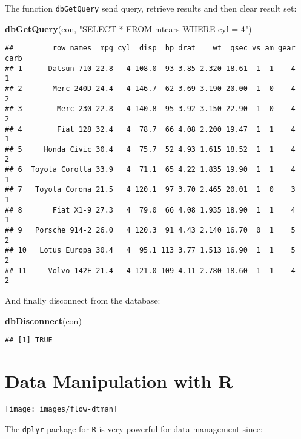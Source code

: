 \documentclass[]{book}
\newenvironment{Shaded}{\begin{snugshade}}{\end{snugshade}}
\newcommand{\KeywordTok}[1]{\textcolor[rgb]{0.13,0.29,0.53}{\textbf{{#1}}}}
\newcommand{\StringTok}[1]{\textcolor[rgb]{0.31,0.60,0.02}{{#1}}}
\newcommand{\NormalTok}[1]{{#1}}
\begin{document}
The function \texttt{dbGetQuery} send query, retrieve results and then
clear result set:

\begin{Shaded}
\begin{Highlighting}[]
\KeywordTok{dbGetQuery}\NormalTok{(con, }\StringTok{"SELECT * FROM mtcars WHERE cyl = 4"}\NormalTok{)}
\end{Highlighting}
\end{Shaded}

\begin{verbatim}
##         row_names  mpg cyl  disp  hp drat    wt  qsec vs am gear carb
## 1      Datsun 710 22.8   4 108.0  93 3.85 2.320 18.61  1  1    4    1
## 2       Merc 240D 24.4   4 146.7  62 3.69 3.190 20.00  1  0    4    2
## 3        Merc 230 22.8   4 140.8  95 3.92 3.150 22.90  1  0    4    2
## 4        Fiat 128 32.4   4  78.7  66 4.08 2.200 19.47  1  1    4    1
## 5     Honda Civic 30.4   4  75.7  52 4.93 1.615 18.52  1  1    4    2
## 6  Toyota Corolla 33.9   4  71.1  65 4.22 1.835 19.90  1  1    4    1
## 7   Toyota Corona 21.5   4 120.1  97 3.70 2.465 20.01  1  0    3    1
## 8       Fiat X1-9 27.3   4  79.0  66 4.08 1.935 18.90  1  1    4    1
## 9   Porsche 914-2 26.0   4 120.3  91 4.43 2.140 16.70  0  1    5    2
## 10   Lotus Europa 30.4   4  95.1 113 3.77 1.513 16.90  1  1    5    2
## 11     Volvo 142E 21.4   4 121.0 109 4.11 2.780 18.60  1  1    4    2
\end{verbatim}

And finally disconnect from the database:

\begin{Shaded}
\begin{Highlighting}[]
\KeywordTok{dbDisconnect}\NormalTok{(con)}
\end{Highlighting}
\end{Shaded}

\begin{verbatim}
## [1] TRUE
\end{verbatim}

\chapter{Data Manipulation with R}\label{data-manipulation-with-r}

\begin{center}\texttt{[image: images/flow-dtman]} \end{center}

The \texttt{dplyr} package for \texttt{R} is very powerful for data
management since:
\end{document}
